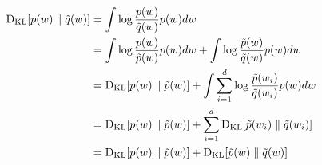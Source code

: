 \documentclass[10pt]{beamer}
\begin{document}
\begin{frame}
\begin{equation*}
\begin{split}
\text{D}_\text{KL}[p(w) \parallel \tilde{q}(w)] &= \int \log\frac{p(w)}{\tilde{q}(w)} p(w) dw \\
&= \int \log\frac{p(w)}{\tilde{p}(w)} p(w) dw + \int \log\frac{\tilde p(w)}{\tilde q(w)} p(w) dw
\\
&= \text{D}_\text{KL}[p(w) \parallel \tilde p(w)] + \int \sum_{i=1}^d \log \frac{\tilde p(w_i)}{\tilde q(w_i)} p(w) dw
\\
&= \text{D}_\text{KL}[p(w) \parallel \tilde p(w)] + \sum_{i=1}^d \text{D}_\text{KL}[\tilde p(w_i) \parallel \tilde q(w_i)]
\\
&= \text{D}_\text{KL}[p(w) \parallel \tilde p(w)] + \text{D}_\text{KL}[\tilde p(w) \parallel \tilde q(w)]
\end{split}
\end{equation*}
\end{frame}
\end{document}
